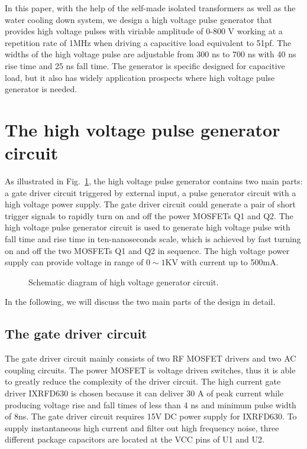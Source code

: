 \documentclass[aip,rsi,reprint,graphicx]{revtex4-1} %
\begin{document}
In this paper, with the help of the self-made isolated transformers as well as the water cooling down system, we design a high voltage pulse generator that provides high voltage pulses with viriable amplitude of 0-800 V working at a repetition rate of 1MHz when driving a capacitive load equivalent to 51pf.
 The widths of the high voltage pulse are adjustable from 300 ns to 700 ns with 40 ns rise time and 25 ns fall time.
 The generator is specific designed for capacitive load, but it also has widely application prospects where high voltage pulse generator is needed.

\section{The high voltage pulse generator circuit}
As illustrated in Fig.~\ref{Fig1}, the high voltage pulse generator contains two main parts: a gate driver circuit triggered by external input, a pulse generator circuit with a high voltage power supply. The gate driver circuit could generate a pair of short trigger signals to rapidly turn on and off the power MOSFETs Q1 and Q2. The high voltage pulse generator circuit is used to generate high voltage pulse with fall time and rise time in ten-nanoseconds scale, which is achieved by fast turning on and off the two MOSFETs Q1 and Q2 in sequence. The high voltage power supply can provide voltage in range of $0\sim1$KV with current up to 500mA.

\begin{figure}[hbt]
\caption{Schematic diagram of high voltage generator circuit.\label{Fig1}}%
\end{figure}

In the following, we will discuss the two main parts of the design in detail.

\subsection{The gate driver circuit}
The gate driver circuit mainly consists of two RF MOSFET drivers and two AC coupling circuits.
 The power MOSFET is voltage driven switches, thus it is able to greatly reduce the complexity of the driver circuit.
 The high current gate driver IXRFD630 is chosen because it can deliver 30 A of peak current while producing voltage rise and fall times of less than 4 ns and minimum pulse width of 8ns.
 The gate driver circuit requires 15V DC power supply for IXRFD630.
 To supply instantaneous high current and filter out high frequency noise, three different package capacitors are located at the VCC pins of U1 and U2.
\end{document}
